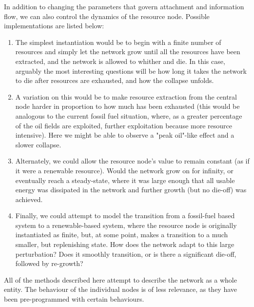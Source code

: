 \documentclass{paper}
\begin{document}
	In addition to changing the parameters that govern attachment and information flow, we can also control the dynamics of the resource node. Possible implementations are listed below:
	\begin{enumerate}
		\item The simplest instantiation would be to begin with a finite number of resources and simply let the network grow until all the resources have been extracted, and the network is allowed to whither and die. In this case, arguably the most interesting questions will be how long it takes the network to die after resources are exhausted, and how the collapse unfolds.
		\item A variation on this would be to make resource extraction from the central node harder in proportion to how much has been exhausted (this would be analogous to the current fossil fuel situation, where, as a greater percentage of the oil fields are exploited, further exploitation because more resource intensive). Here we might be able to observe a "peak oil"-like effect and a slower collapse.
		\item Alternately, we could allow the resource node's value to remain constant (as if it were a renewable resource). Would the network grow on for infinity, or eventually reach a steady-state, where it was large enough that all usable energy was dissipated in the network and further growth (but no die-off) was achieved. 
		\item Finally, we could attempt to model the transition from a fossil-fuel based system to a renewable-based system, where the resource node is originally instantiated as finite, but, at some point, makes a transition to a much smaller, but replenishing state. How does the network adapt to this large perturbation? Does it smoothly transition, or is there a significant die-off, followed by re-growth?
	\end{enumerate}
	
	All of the methods described here attempt to describe the network as a whole entity. The behaviour of the individual nodes is of less relevance, as they have been pre-programmed with certain behaviours. 
	
	
	
\end{document}
